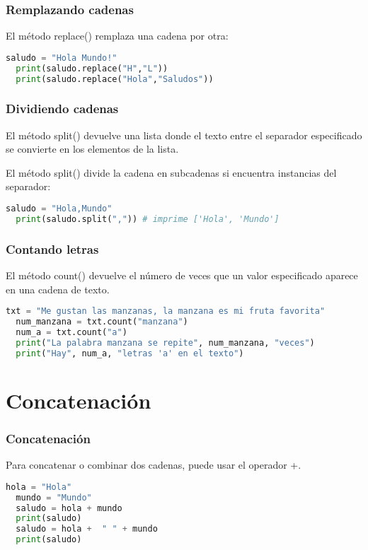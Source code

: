 \begin{frame}[fragile]
  \frametitle{Remplazando cadenas}

  El método \textcolor{codeKeyword}{replace}() remplaza una cadena por otra:

  \vspace{\baselineskip}
  \begin{lstlisting}[language=Python]
  saludo = "Hola Mundo!"
  print(saludo.replace("H","L"))
  print(saludo.replace("Hola","Saludos"))
  \end{lstlisting}
\end{frame}

\begin{frame}[fragile]
  \frametitle{Dividiendo cadenas}

  El método \textcolor{codeKeyword}{split}() devuelve una lista donde
  el texto entre el separador especificado se convierte en los elementos
  de la lista.

  \vspace{\baselineskip}
  El método \textcolor{codeKeyword}{split}() divide la cadena en
  subcadenas si encuentra instancias del separador:
  \begin{lstlisting}[language=Python]
  saludo = "Hola,Mundo"
  print(saludo.split(",")) # imprime ['Hola', 'Mundo']
  \end{lstlisting}
\end{frame}

\begin{frame}[fragile]
  \frametitle{Contando letras}

  El método \textcolor{codeKeyword}{count}() devuelve el número de veces que
  un valor especificado aparece en una cadena de texto.

  \vspace{\baselineskip}
  \begin{lstlisting}[language=Python]
  txt = "Me gustan las manzanas, la manzana es mi fruta favorita"
  num_manzana = txt.count("manzana")
  num_a = txt.count("a")
  print("La palabra manzana se repite", num_manzana, "veces")
  print("Hay", num_a, "letras 'a' en el texto")
  \end{lstlisting}
\end{frame}

\section{Concatenación}

\begin{frame}[fragile]
  \frametitle{Concatenación}

  Para concatenar o combinar dos cadenas, puede usar el operador +.

  \begin{lstlisting}[language=Python]
  hola = "Hola"
  mundo = "Mundo"
  saludo = hola + mundo
  print(saludo)
  saludo = hola +  " " + mundo
  print(saludo)
  \end{lstlisting}
\end{frame}


